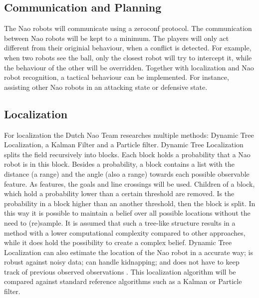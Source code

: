 \documentclass[11pt]{llncs}
\begin{document}
\subsection{Communication and Planning}
The Nao robots will communicate using a zeroconf protocol. The  communication between Nao robots will be kept to a minimum. The players will only act different from their originial behaviour, when a conflict is detected. For example, when two robots see the ball, only the closest robot will try to intercept it, while the behaviour of the other will be overridden. Together with localization and Nao robot recognition, a tactical behaviour can be implemented. For instance, assisting other Nao robots in an attacking state or defensive state.
\subsection{Localization}
For localization the Dutch Nao Team researches multiple methods: Dynamic Tree Localization, a Kalman Filter and a Particle filter. 
Dynamic Tree Localization \cite{vdMolen2011} splits the field recursively into blocks. Each block holds a probability that a Nao robot is in this block. 
Besides a probability, a block contains a list with the distance (a range) and the angle (also a range) towards each possible observable feature. 
As features, the goals and line crossings will be used. Children of a block, which hold a probability lower than a certain threshold are removed.
Is the probability in a block higher than an another threshold, then the block is split. In this way it is possible to maintain a belief over all possible locations without the need to (re)sample.
It is assumed that such a tree-like structure results in a method with a lower computational complexity compared to other approaches, while it does hold the possibility to create a complex belief. 
Dynamic Tree Localization can also estimate the location of the Nao robot in a accurate way; is robust against noisy data; can handle kidnapping; and does not have to keep track of previous observed observations \cite{vdMolen2011}.
This localization algorithm will be compared against standard reference algorithms such as a Kalman or Particle filter. 
\end{document}

